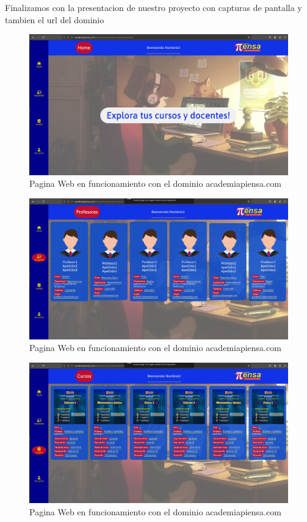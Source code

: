 Finalizamos con la presentacion de nuestro proyecto con capturas de pantalla y tambien el url del dominio 
\begin{figure}[H]
  \centering
  \includegraphics[width=1.0\textwidth]{img/AulaVirtual.png}
  \caption{Pagina Web en funcionamiento con el dominio academiapiensa.com}
\end{figure}
\begin{figure}[H]
  \centering
  \includegraphics[width=1.0\textwidth]{img/AulaVirtual2.png}
  \caption{Pagina Web en funcionamiento con el dominio academiapiensa.com}
\end{figure}
\begin{figure}[H]
  \centering
  \includegraphics[width=1.0\textwidth]{img/AulaVirtual3.png}
  \caption{Pagina Web en funcionamiento con el dominio academiapiensa.com}
\end{figure}
